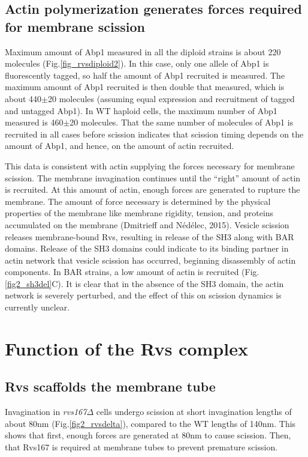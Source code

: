 \subsection{ Actin polymerization generates forces required for membrane scission}
Maximum amount of Abp1 measured in all the diploid strains is about 220 molecules (Fig.\ref{fig_rvsdiploid2}). In this case, only one allele of Abp1 is fluorescently tagged, so half the amount of Abp1 recruited is measured. The maximum amount of Abp1 recruited is then double that measured, which is about 440$\pm$20 molecules (assuming equal expression and recruitment of tagged and untagged Abp1). In WT haploid cells, the maximum number of Abp1 measured is 460$\pm$20 molecules. That the same number of molecules of Abp1 is recruited in all cases before scission indicates that scission timing depends on the amount of Abp1, and hence, on the amount of actin recruited. 

\vspace{5mm}
This data is consistent with actin supplying the forces necessary for membrane scission. The membrane invagination continues until the “right” amount of actin is recruited. At this amount of actin, enough forces are generated to rupture the membrane. The amount of force necessary is determined by the physical properties of the membrane like membrane rigidity, tension, and proteins accumulated on the membrane (Dmitrieff and Nédélec, 2015). Vesicle scission releases membrane-bound Rvs, resulting in release of the SH3 along with BAR domains. Release of the SH3 domains could indicate to its binding partner in actin network that vesicle scission has occurred, beginning disassembly of actin components. In BAR strains, a low amount of actin is recruited (Fig.\ref{fig2_sh3del}C). It is clear that in the absence of the SH3 domain, the actin network is severely perturbed, and the effect of this on scission dynamics is currently unclear. 

\section{Function of the Rvs complex}

\subsection{Rvs scaffolds the membrane tube}
Invagination in \textit{rvs167$\Delta$} cells undergo scission at short invagination lengths of about 80nm (Fig.\ref{fig2_rvsdelta}), compared to the WT lengths of 140nm. This shows that first, enough forces are generated at 80nm to cause scission. Then, that Rvs167 is required at membrane tubes to prevent premature scission. 

